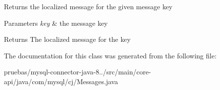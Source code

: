 Returns the localized message for the given message key


\begin{DoxyParams}{Parameters}
{\em key} & the message key \\
\hline
\end{DoxyParams}
\begin{DoxyReturn}{Returns}
The localized message for the key 
\end{DoxyReturn}


The documentation for this class was generated from the following file\+:\begin{DoxyCompactItemize}
\item 
pruebas/mysql-\/connector-\/java-\/8../src/main/core-\/api/java/com/mysql/cj/Messages.\+java\end{DoxyCompactItemize}
